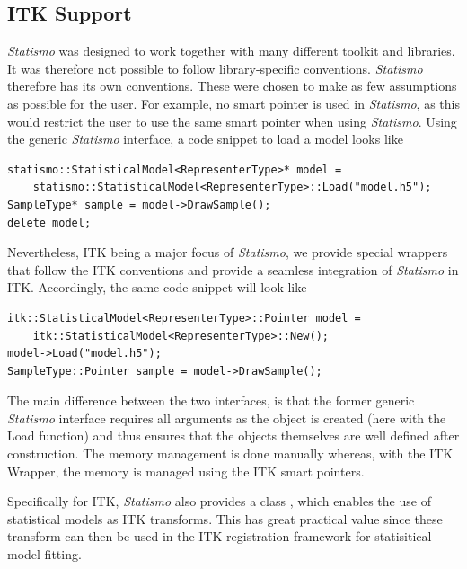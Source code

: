 \documentclass{InsightArticle}
\newcommand{\Statismo}{\emph{Statismo}\xspace}
\begin{document}
\subsection{ITK Support}
\Statismo was designed to work together with many different toolkit
and libraries. It was therefore not possible to follow
library-specific conventions. \Statismo therefore has its own
conventions. These were chosen to make as few assumptions as possible
for the user. For example, no smart pointer is used in \Statismo, as
this would restrict the user to use the same smart pointer when using
\Statismo. Using the generic \Statismo interface, a code snippet to
load a model looks like
\begin{verbatim}
statismo::StatisticalModel<RepresenterType>* model = 
    statismo::StatisticalModel<RepresenterType>::Load("model.h5");
SampleType* sample = model->DrawSample();
delete model;
\end{verbatim}
Nevertheless, ITK being a major focus of \Statismo, we
provide special wrappers that follow the ITK conventions and provide a seamless integration of  \Statismo in ITK. 
Accordingly, the same code snippet will look like
\begin{verbatim}
itk::StatisticalModel<RepresenterType>::Pointer model = 
    itk::StatisticalModel<RepresenterType>::New();
model->Load("model.h5");
SampleType::Pointer sample = model->DrawSample();
\end{verbatim}
The main difference between the two interfaces, is that the former generic \Statismo interface
requires all arguments as the object is created
(here with the Load function) and thus ensures that 
the objects themselves are well defined after construction.
The memory management is done manually whereas, with the ITK Wrapper, the memory is managed using the ITK smart pointers. 

Specifically for ITK, \Statismo also provides a class , which 
enables the use of statistical models as ITK transforms. This has great practical value since these transform can then be used in the  ITK registration framework for statisitical model fitting. 
\end{document}
